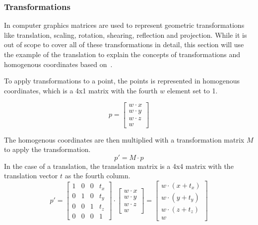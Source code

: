 \subsubsection{Transformations}

In computer graphics matrices are used to represent geometric transformations like translation, scaling, rotation,
shearing, reflection and projection.
While it is out of scope to cover all of these transformations in detail,
this section will use the example of the translation to explain the concepts of
transformations and homogenous coordinates based on~\cite{dorner_virtual_2019}.

To apply transformations to a point, the points is represented in homogenous coordinates,
which is a 4x1 matrix with the fourth $w$ element set to 1.

\begin{equation}
    p = \begin{bmatrix}
            w \cdot x \\
            w \cdot y \\
            w \cdot z \\
            w
    \end{bmatrix}
\end{equation}

The homogenous coordinates are then multiplied with a transformation matrix $M$ to apply the transformation.
\begin{equation}
    p' = M \cdot p
\end{equation}
In the case of a translation, the translation matrix is a 4x4 matrix with the translation vector $t$ as the fourth column.
\begin{equation}
    p' = \begin{bmatrix}
             1 & 0 & 0 & t_x \\
             0 & 1 & 0 & t_y \\
             0 & 0 & 1 & t_z \\
             0 & 0 & 0 & 1
    \end{bmatrix} \cdot \begin{bmatrix}
                            w \cdot x \\
                            w \cdot y \\
                            w \cdot z \\
                            w
    \end{bmatrix} = \begin{bmatrix}
                        w \cdot (x + t_x) \\
                        w \cdot (y + t_y) \\
                        w \cdot (z + t_z) \\
                        w
    \end{bmatrix}
\end{equation}


